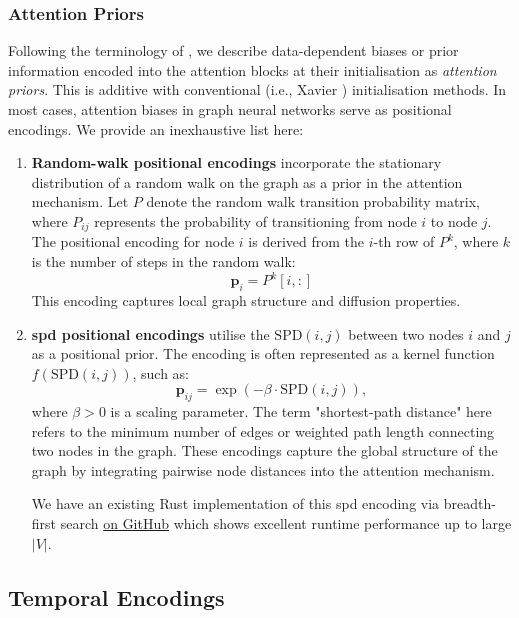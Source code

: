 \documentclass{article}
\begin{document}
\subsubsection{Attention Priors}
Following the terminology of \textcite{lin_survey_2021}, we describe data-dependent biases or prior information encoded into the attention blocks at their initialisation as \textit{attention priors}. This is additive with conventional (i.e., Xavier \cite{pmlr-v9-glorot10a}) initialisation methods. In most cases, attention biases in graph neural networks serve as positional encodings. We provide an inexhaustive list here:
\begin{enumerate}
    \item \textbf{Random-walk positional encodings} \cite{rampasek_recipe_2022} incorporate the stationary distribution of a random walk on the graph as a prior in the attention mechanism. Let \( P \) denote the random walk transition probability matrix, where \( P_{ij} \) represents the probability of transitioning from node \( i \) to node \( j \). The positional encoding for node \( i \) is derived from the \( i \)-th row of \( P^k \), where \( k \) is the number of steps in the random walk:
    \[
    \mathbf{p}_i = P^k[i, :]
    \]
    This encoding captures local graph structure and diffusion properties.

    \item \textbf{\gls{spd} positional encodings} \cite{chengxuan_transformers_2021} utilise the \( \text{SPD}(i, j) \) between two nodes \( i \) and \( j \) as a positional prior. The encoding is often represented as a kernel function \( f(\text{SPD}(i, j)) \), such as:
    \[
    \mathbf{p}_{ij} = \exp(-\beta \cdot \text{SPD}(i, j)),
    \]
    where \( \beta > 0 \) is a scaling parameter. The term "shortest-path distance" here refers to the minimum number of edges or weighted path length connecting two nodes in the graph. These encodings capture the global structure of the graph by integrating pairwise node distances into the attention mechanism.

    We have an existing Rust implementation of this \gls{spd} encoding via breadth-first search \href{https://github.com/luke-a-thompson/AmesFormer/tree/main/gnn-tools}{on GitHub} which shows excellent runtime performance up to large $|V|$.
\end{enumerate}

\subsection{Temporal Encodings}
\end{document}
